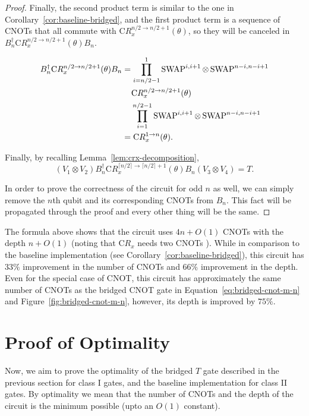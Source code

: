\begin{proof}
  Finally, the second product term is similar to the one in Corollary~\ref{cor:baseline-bridged}, and the first product term is a sequence of CNOTs that all commute with $\mathrm{C}R_x^{n/2 \to n/2 + 1}(\theta)$, so they will be canceled in $B_n^\dagger \mathrm{C}R_x^{n/2 \to n/2 + 1}(\theta) B_n$.

  \begin{equation}
    \begin{aligned}
    B^\dagger_n \mathrm{C}R_x^{n/2 \to n/2 + 1}(\theta) B_n &= \prod_{i=n/2 - 1}^{1} \operatorname{SWAP}^{i, i+1} \otimes \operatorname{SWAP}^{n-i, n-i+1} \\
    & \phantom{=}~\mathrm{C}R_x^{n/2 \to n/2 + 1}(\theta) \\
    & \phantom{=}~\prod_{i=1}^{n/2 - 1} \operatorname{SWAP}^{i, i+1} \otimes \operatorname{SWAP}^{n-i, n-i+1} \\
    &= \mathrm{C}R_x^{1 \to n}(\theta).
    \end{aligned}
  \end{equation}

  Finally, by recalling Lemma~\ref{lem:crx-decomposition},
  \begin{equation}
    (V_1 \otimes V_2) B^\dagger_n \mathrm{C}R_x^{\lceil n/2 \rceil \to \lceil n/2\rceil+1}(\theta) B_n (V_3 \otimes V_4) = T.
  \end{equation}
  
  In order to prove the correctness of the circuit for odd $n$ as well, we can simply remove the $n$th qubit and its corresponding CNOTs from $B_n$. This fact will be propagated through the proof and every other thing will be the same.
\end{proof}

The formula above shows that the circuit uses $4n + O(1)$ CNOTs with the depth $n + O(1)$ (noting that $\mathrm{C}R_x$ needs two CNOTs \cite[chapter 4]{nielsen2010}).
While in comparison to the baseline implementation (see Corollary~\ref{cor:baseline-bridged}), this circuit has $33\%$ improvement in the number of CNOTs and $66\%$ improvement in the depth. Even for the special case of CNOT, this circuit has approximately the same number of CNOTs as the bridged CNOT gate in Equation~\ref{eq:bridged-cnot-m-n} and Figure~\ref{fig:bridged-cnot-m-n}, however, its depth is improved by $75\%$.

\section{Proof of Optimality}

Now, we aim to prove the optimality of the bridged $T$ gate described in the previous section for class I gates, and the baseline implementation for class II gates. By optimality we mean that the number of CNOTs and the depth of the circuit is the minimum possible (upto an $O(1)$ constant).

